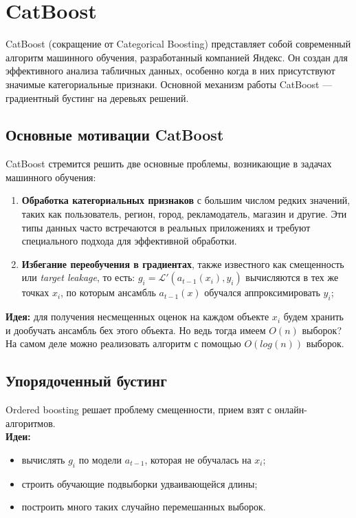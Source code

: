 \section{CatBoost}

CatBoost (сокращение от Categorical Boosting) представляет собой современный алгоритм машинного обучения, разработанный компанией Яндекс. Он создан для эффективного анализа табличных данных, особенно когда в них присутствуют значимые категориальные признаки. Основной механизм работы CatBoost — градиентный бустинг на деревьях решений.

\subsection*{Основные мотивации CatBoost}

CatBoost стремится решить две основные проблемы, возникающие в задачах машинного обучения:

\begin{enumerate}
    \item \textbf{Обработка категориальных признаков} с большим числом редких значений, таких как пользователь, регион, город, рекламодатель, магазин и другие. Эти типы данных часто встречаются в реальных приложениях и требуют специального подхода для эффективной обработки.
    
    \item \textbf{Избегание переобучения в градиентах}, также известного как смещенность или \textit{target leakage}, то есть: $g_i = \mathcal{L}'(a_{t-1}(x_i), y_i)$ вычисляются в тех же точках $x_i$, по которым ансамбль $a_{t-1}(x)$ обучался аппроксимировать $y_i$;
\end{enumerate}

\textbf{Идея:} для получения несмещенных оценок на каждом объекте $x_i$ будем хранить и дообучать ансамбль бех этого объекта. Но ведь тогда имеем $O(n)$ выборок? На самом деле можно реализовать алгоритм с помощью $O(log(n))$ выборок. 

\subsection*{Упорядоченный бустинг}

Ordered boosting решает проблему смещенности, прием взят с онлайн-алгоритмов.\\

\textbf{Идеи:}

\begin{itemize}
    \item вычислять \(g_i\) по модели \(a_{t-1}\), которая не обучалась на \(x_i\);
    \item строить обучающие подвыборки удваивающейся длины;
    \item построить много таких случайно перемешанных выборок.
\end{itemize}

